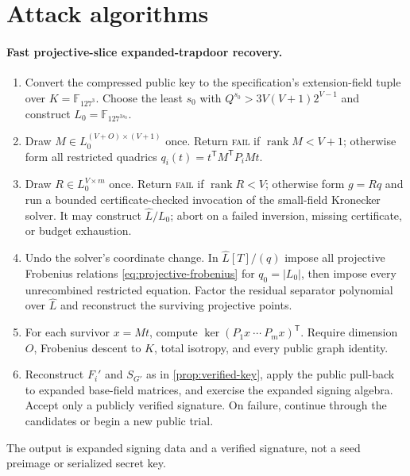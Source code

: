 \documentclass[10pt,a4paper]{article}
\newcommand{\F}{\mathbb F}
\newcommand{\rank}{\operatorname{rank}}
\newcommand{\trans}{\mathsf T}
\begin{document}
\appendix

\section{Attack algorithms}\label{app:algorithms}

\paragraph{Fast projective-slice expanded-trapdoor recovery.}
\begin{enumerate}
\item Convert the compressed public key to the specification's extension-field tuple over $K=\F_{127^3}$.  Choose the least $s_0$ with $Q^{s_0}>3V(V+1)2^{V-1}$ and construct $L_0=\F_{127^{3s_0}}$.
\item Draw $M\in L_0^{(V+O)\times(V+1)}$ once.  Return \textsc{fail} if $\rank M<V+1$; otherwise form all restricted quadrics $q_i(t)=t^{\trans}M^{\trans}P_iMt$.
\item Draw $R\in L_0^{V\times m}$ once.  Return \textsc{fail} if $\rank R<V$; otherwise form $g=Rq$ and run a bounded certificate-checked invocation of the small-field Kronecker solver.  It may construct $\widehat L/L_0$; abort on a failed inversion, missing certificate, or budget exhaustion.
\item Undo the solver's coordinate change.  In $\widehat L[T]/(q)$ impose all projective Frobenius relations \eqref{eq:projective-frobenius} for $q_0=|L_0|$, then impose every unrecombined restricted equation.  Factor the residual separator polynomial over $\widehat L$ and reconstruct the surviving projective points.
\item For each survivor $x=Mt$, compute $\ker(P_1x\ \cdots\ P_mx)^{\trans}$.  Require dimension $O$, Frobenius descent to $K$, total isotropy, and every public graph identity.
\item Reconstruct $F_i'$ and $S_{G'}$ as in \cref{prop:verified-key}, apply the public pull-back to expanded base-field matrices, and exercise the expanded signing algebra.  Accept only a publicly verified signature.  On failure, continue through the candidates or begin a new public trial.
\end{enumerate}
The output is expanded signing data and a verified signature, not a seed preimage or serialized secret key.
\end{document}
